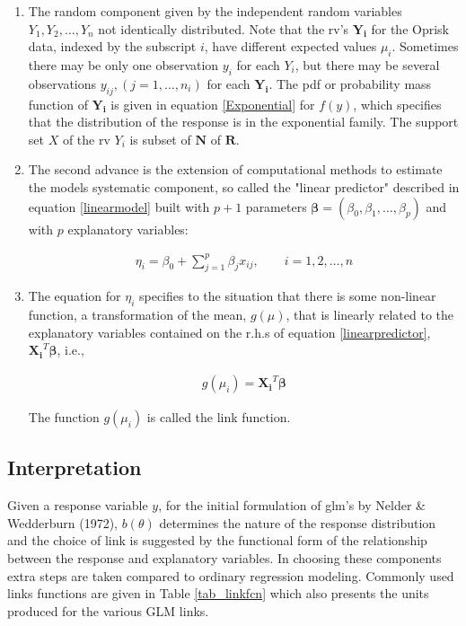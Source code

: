 \documentclass{DissertateUSU}
\begin{document}
\begin{enumerate}
\item The random component given by the independent random variables $Y_1, Y_2, \ldots, Y_n $ not identically distributed. Note that the rv's $\mathbf{Y_i}$ for the Oprisk data, indexed by the subscript $i$, have different expected values $\mu_i$. Sometimes there may be only one observation $y_i$ for each $Y_i$, but there may be several observations $y_{ij}, (j=1,\ldots,n_i)$ for each $\mathbf{Y_i}$. The pdf or probability mass function of $\mathbf{Y_i}$ is given in equation \ref{Exponential} for $f(y)$, which specifies that the distribution of the response is in the exponential family. The support set $X$ of the rv $Y_i$ is subset of $\mathbf{N}$ of $\mathbf{R}$. 

\item The second advance is the extension of computational methods to estimate the models systematic component, so called the "linear predictor" described in equation \ref{linearmodel} built with $p+1$ parameters $\mathbf{\beta} = (\beta_0,\beta_1,\ldots,\beta_p)$ and with $p$ explanatory variables:

\singlespacing
\begin{eqnarray}\label{linearpredictor}
\eta_i = \beta_0 + \sum_{j=1}^{p}\beta_jx_{ij}, \qquad i = 1,2,\ldots,n
\end{eqnarray}
\doublespacing

\item The equation for $\eta_i$ specifies to the situation that there is some non-linear function, a transformation of the mean, $g(\mu)$, that is linearly related to the explanatory variables contained on the r.h.s of equation \ref{linearpredictor}, $\mathbf{X_i}^T\mathbf{\beta}$, i.e.,

\singlespacing
\begin{eqnarray}
g(\mu_i) = \mathbf{X_i}^T\mathbf{\beta}
\end{eqnarray}
\doublespacing

The function $g(\mu_i)$ is called the link function.
\end{enumerate}

\subsection{Interpretation}

Given a response variable \(y\), for the initial formulation of glm's by
Nelder \& Wedderburn (1972), \(b(\theta)\) determines the nature of the
response distribution and the choice of link is suggested by the
functional form of the relationship between the response and explanatory
variables. In choosing these components extra steps are taken compared
to ordinary regression modeling. Commonly used links functions are given
in Table \ref{tab_linkfcn} which also presents the units produced for
the various GLM links.
\end{document}
